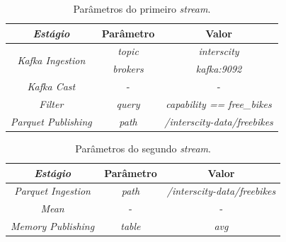 \begin{table}[hbt]
    \centering
    \caption{Parâmetros do primeiro \textit{stream}.}
    \label{tab:case2-1}
    \begin{tabular}{|c|c|c|}
        \hline
        \textit{\textbf{Estágio}}                   & \textbf{Parâmetro} & \textbf{Valor}                      \\ \hline
        \multirow{2}{*}{\textit{Kafka Ingestion}} & \textit{topic}     & \textit{interscity}                 \\ \cline{2-3} 
                                                  & \textit{brokers}   & \textit{kafka:9092}                 \\ \hline
                                                  \textit{Kafka Cast}                       & -                  & -                                   \\ \hline
                                                  \textit{Filter}                           & \textit{query}     & \textit{capability == free\_bikes}  \\ \hline
                                                  \textit{Parquet Publishing}               & \textit{path}      & \textit{/interscity-data/freebikes} \\ \hline
    \end{tabular}
\end{table}

\begin{table}[hbt]
\centering
    \caption{Parâmetros do segundo \textit{stream}.}
\label{tab:case2-2}
\begin{tabular}{|c|c|c|}
\hline
\textit{\textbf{Estágio}}    & \textbf{Parâmetro} & \textbf{Valor}                      \\ \hline
\textit{Parquet Ingestion} & \textit{path}      & \textit{/interscity-data/freebikes} \\ \hline
\textit{Mean}              & -                  & -                                   \\ \hline
\textit{Memory Publishing} & \textit{table}     & \textit{avg}                        \\ \hline
\end{tabular}
\end{table}

